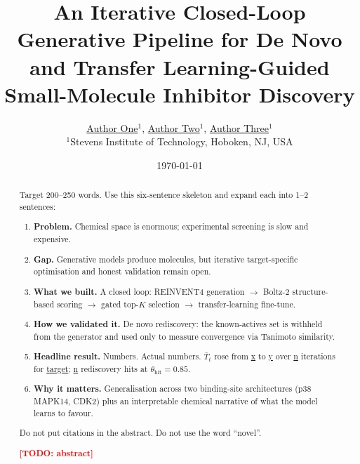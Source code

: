\documentclass[11pt]{article}
\newcommand{\TODO}[1]{\textcolor{red}{\textbf{[TODO: #1]}}}
\newcommand{\FILL}[1]{\textcolor{blue!65!black}{\underline{\textsf{#1}}}}
\newcommand{\thetahit}{\theta_{\mathrm{hit}}}
\newcommand{\Tbar}{\bar{T}}
\begin{document}
\title{\bfseries An Iterative Closed-Loop Generative Pipeline for De Novo
and Transfer Learning-Guided Small-Molecule Inhibitor Discovery}

\author{%
  \FILL{Author One}$^{1}$, \FILL{Author Two}$^{1}$, \FILL{Author Three}$^{1}$ \\[0.4em]
  \small $^{1}$Stevens Institute of Technology, Hoboken, NJ, USA \\
}
\date{\today}
\maketitle

\begin{abstract}
\noindent
\begin{guide}[Abstract]
Target 200--250 words. Use this six-sentence skeleton and expand each into
1--2 sentences:
\begin{enumerate}\itemsep0pt
  \item \textbf{Problem.} Chemical space is enormous; experimental screening
        is slow and expensive.
  \item \textbf{Gap.} Generative models produce molecules, but iterative
        target-specific optimisation and honest validation remain open.
  \item \textbf{What we built.} A closed loop: REINVENT4 generation
        $\rightarrow$ Boltz-2 structure-based scoring $\rightarrow$ gated
        top-$K$ selection $\rightarrow$ transfer-learning fine-tune.
  \item \textbf{How we validated it.} De novo rediscovery: the known-actives
        set is withheld from the generator and used only to measure
        convergence via Tanimoto similarity.
  \item \textbf{Headline result.} Numbers. Actual numbers. $\Tbar_t$ rose
        from \FILL{x} to \FILL{y} over \FILL{n} iterations for
        \FILL{target}; \FILL{n} rediscovery hits at $\thetahit = 0.85$.
  \item \textbf{Why it matters.} Generalisation across two binding-site
        architectures (p38 MAPK14, CDK2) plus an interpretable chemical
        narrative of what the model learns to favour.
\end{enumerate}
Do not put citations in the abstract. Do not use the word ``novel''.
\end{guide}

\TODO{abstract}
\end{abstract}
\end{document}
